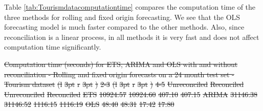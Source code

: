 \documentclass[11pt,a4paper,]{article}
\let\origtable\table
\let\endorigtable\endtable
\renewenvironment{table}[1][2] {
    \expandafter\origtable\expandafter[!htbp]
} {
    \endorigtable
}
\providecommand{\DIFdeltex}[1]{{\protect\color{red}\sout{#1}}}                      %
\providecommand{\DIFaddend}{} %
\providecommand{\DIFdelbegin}{} %
\providecommand{\DIFdelFL}[1]{\DIFdel{#1}} %
\providecommand{\DIFdel}[1]{\texorpdfstring{\DIFdeltex{#1}}{}} %
\newcommand{\DIFscaledelfig}{0.5}
\newlength{\DIFdelgraphicswidth} %
\newlength{\DIFdelgraphicsheight} %
\newcommand{\DIFdelincludegraphics}[2][]{%
\sbox{\DIFdelgraphicsbox}{\DIFOincludegraphics[#1]{#2}}%
\settoboxwidth{\DIFdelgraphicswidth}{\DIFdelgraphicsbox} %
\settoboxtotalheight{\DIFdelgraphicsheight}{\DIFdelgraphicsbox} %
\scalebox{\DIFscaledelfig}{%
\parbox[b]{\DIFdelgraphicswidth}{\usebox{\DIFdelgraphicsbox}\\[-\baselineskip] \rule{\DIFdelgraphicswidth}{0em}}\llap{\resizebox{\DIFdelgraphicswidth}{\DIFdelgraphicsheight}{%
\setlength{\unitlength}{\DIFdelgraphicswidth}%
\begin{picture}(1,1)%
\thicklines\linethickness{2pt} %
{\color[rgb]{1,0,0}\put(0,0){\framebox(1,1){}}}%
{\color[rgb]{1,0,0}\put(0,0){\line( 1,1){1}}}%
{\color[rgb]{1,0,0}\put(0,1){\line(1,-1){1}}}%
\end{picture}%
}\hspace*{3pt}}} %
} %
\DeclareRobustCommand{\DIFaddend}{\DIFOaddend \let\includegraphics\DIFOincludegraphics} %
\DeclareRobustCommand{\DIFdelbegin}{\DIFOdelbegin \let\includegraphics\DIFdelincludegraphics} %
\begin{document}
\DIFaddend Table \ref{tab:Tourismdatacomputationtime} compares the computation time of the three methods for rolling and fixed origin forecasting. We see that the OLS forecasting model is much faster compared to the other methods. Also, since reconciliation is a linear process, in all methods it is very fast and does not affect computation time significantly.

\DIFdelbegin %

{%
\DIFdelFL{Computation time (seconds) for ETS, ARIMA and OLS with and without reconciliation - Rolling and fixed origin forecasts on a 24 month test set - Tourism dataset}}
\DIFdelFL{(l}%
\DIFdelFL{3pt}%
\DIFdelFL{r}%
\DIFdelFL{3pt}%
\DIFdelFL{)}%
\DIFdelFL{2-3}%
\DIFdelFL{(l}%
\DIFdelFL{3pt}%
\DIFdelFL{r}%
\DIFdelFL{3pt}%
\DIFdelFL{)}%
\DIFdelFL{4-5}%
\DIFdelFL{Unreconciled }%
\DIFdelFL{Reconciled }%
\DIFdelFL{Unreconciled }%
\DIFdelFL{Reconciled}%
\DIFdelFL{ETS }%
\DIFdelFL{10924.57 }%
\DIFdelFL{10924.60 }%
\DIFdelFL{407.10 }%
\DIFdelFL{407.15}%
\DIFdelFL{ARIMA }%
\DIFdelFL{31146.38 }%
\DIFdelFL{31146.52 }%
\DIFdelFL{1116.15 }%
\DIFdelFL{1116.19}%
\DIFdelFL{OLS }%
\DIFdelFL{48.40 }%
\DIFdelFL{48.31 }%
\DIFdelFL{17.42 }%
\DIFdelFL{17.80}%
\end{document}
